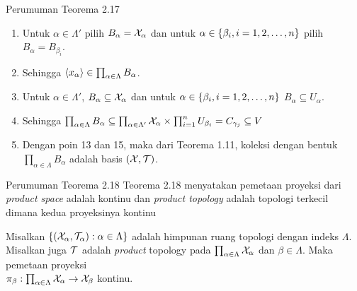 \begin{frame}{Perumuman Teorema 2.17}
    \begin{tcolorbox}[enhanced,title=Teorema 2.30 (Bukti), frame style tile={width=\paperwidth}{\wallpaper}]
        \begin{enumerate}\addtocounter{enumi}{11}
            \item Untuk $\alpha \in \Lambda'$ pilih $B_\alpha = \nX_\alpha$ dan untuk $\alpha \in \set*{\beta_i, i=1,2,\dots,n}$ pilih
            $B_\alpha = B_{\beta_i}$.
            \item Sehingga $\seq*{x_\alpha}\in\prod_{\alpha\in\Lambda}B_\alpha$.
            \item Untuk $\alpha \in \Lambda'$, $B_\alpha \subseteq \nX_\alpha$ dan untuk $\alpha \in \set*{\beta_i, i=1,2,\dots,n}$
            $B_\alpha \subseteq U_{\alpha}$.
            \item Sehingga $\prod_{\alpha\in\Lambda}B_\alpha \subseteq \prod_{\alpha\in\Lambda'}\nX_\alpha\times\prod_{i=1}^n U_{\beta_i} = C_{\gamma_j} \subseteq V$
            \item Dengan poin 13 dan 15, maka dari Teorema 1.11, koleksi dengan bentuk $\prod_{\alpha\in\Lambda}B_\alpha$ adalah basis $(\nX,\nT)$.
        \end{enumerate}
    \end{tcolorbox}
\end{frame}

\begin{frame}{Perumuman Teorema 2.18}
    Teorema 2.18 menyatakan pemetaan proyeksi dari \textit{product space} adalah kontinu dan 
    \textit{product topology} adalah topologi terkecil dimana kedua proyeksinya kontinu
    \begin{tcolorbox}[enhanced,title=Teorema 2.31, frame style tile={width=\paperwidth}{\wallpaper}]
        Misalkan $\set*{\oio*{\nX_\alpha,\nT_\alpha}:\alpha \in \Lambda}$ adalah himpunan ruang topologi
        dengan indeks $\Lambda$. Misalkan juga $\nT$ adalah \textit{product} topology pada $\prod_{\alpha \in \Lambda}\nX_\alpha$ 
        dan $\beta \in \Lambda$. Maka pemetaan proyeksi \\$\pi_\beta:\prod_{\alpha \in \Lambda}\nX_\alpha \to \nX_\beta$ kontinu.
    \end{tcolorbox}
\end{frame}

